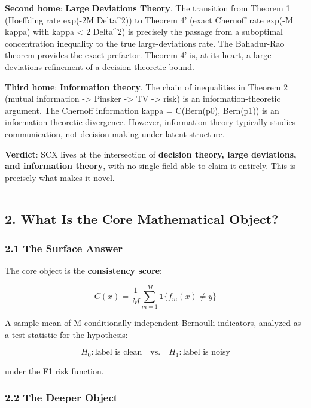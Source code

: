 \documentclass[
  12pt,
]{article}
\begin{document}
\textbf{Second home}: \textbf{Large Deviations Theory}. The transition
from Theorem 1 (Hoeffding rate exp(-2M Delta\^{}2)) to Theorem 4' (exact
Chernoff rate exp(-M kappa) with kappa \textless{} 2 Delta\^{}2) is
precisely the passage from a suboptimal concentration inequality to the
true large-deviations rate. The Bahadur-Rao theorem provides the exact
prefactor. Theorem 4' is, at its heart, a large-deviations refinement of
a decision-theoretic bound.

\textbf{Third home}: \textbf{Information theory}. The chain of
inequalities in Theorem 2 (mutual information -\textgreater{} Pinsker
-\textgreater{} TV -\textgreater{} risk) is an information-theoretic
argument. The Chernoff information kappa = C(Bern(p0), Bern(p1)) is an
information-theoretic divergence. However, information theory typically
studies communication, not decision-making under latent structure.

\textbf{Verdict}: SCX lives at the intersection of \textbf{decision
theory, large deviations, and information theory}, with no single field
able to claim it entirely. This is precisely what makes it novel.

\begin{center}\rule{0.5\linewidth}{0.5pt}\end{center}

\subsection{2. What Is the Core Mathematical
Object?}\label{what-is-the-core-mathematical-object}

\subsubsection{2.1 The Surface Answer}\label{the-surface-answer-1}

The core object is the \textbf{consistency score}:

\[C(x) = \frac{1}{M}\sum_{m=1}^M \mathbf{1}\{f_m(x) \neq y\}\]

A sample mean of M conditionally independent Bernoulli indicators,
analyzed as a test statistic for the hypothesis:

\[H_0: \text{label is clean} \quad\text{vs.}\quad H_1: \text{label is noisy}\]

under the F1 risk function.

\subsubsection{2.2 The Deeper Object}\label{the-deeper-object}
\end{document}
